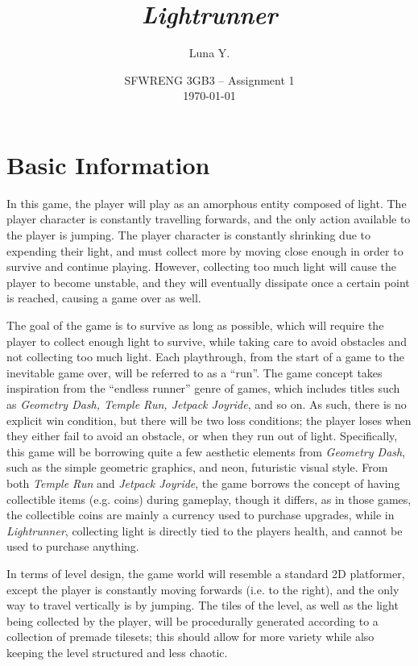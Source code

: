 \documentclass[10pt]{article}
\begin{document}
\title{\textit{Lightrunner}}
\author{Luna Y.}
\date{
    SFWRENG 3GB3 -- Assignment 1\\[0.25cm]
    \today
}
\maketitle

\tableofcontents

\section{Basic Information}

In this game, the player will play as an amorphous entity composed of light. The player character is constantly travelling forwards,
and the only action available to the player is jumping. The player character is constantly shrinking due to expending their light,
and must collect more by moving close enough in order to survive and continue playing. However, collecting too much light will
cause the player to become unstable, and they will eventually dissipate once a certain point is reached, causing a game over as well.

The goal of the game is to survive as long as possible, which will require the player to collect enough light to survive,
while taking care to avoid obstacles and not collecting too much light. Each playthrough, from the start of a game to the inevitable game over,
will be referred to as a ``run''. The game concept takes inspiration from the ``endless runner'' genre of games,
which includes titles such as \textit{Geometry Dash, Temple Run, Jetpack Joyride}, and so on. As such, there is no explicit win condition,
but there will be two loss conditions; the player loses when they either fail to avoid an obstacle, or when they run out of light.
Specifically, this game will be borrowing quite a few aesthetic elements from \textit{Geometry Dash}, such as the simple geometric graphics,
and neon, futuristic visual style. From both \textit{Temple Run} and \textit{Jetpack Joyride}, the game borrows the concept of having
collectible items (e.g. coins) during gameplay, though it differs, as in those games, the collectible coins are mainly a currency
used to purchase upgrades, while in \textit{Lightrunner}, collecting light is directly tied to the players health, and cannot be used to purchase
anything.

In terms of level design, the game world will resemble a standard 2D platformer, except the player is constantly moving forwards (i.e. to the right),
and the only way to travel vertically is by jumping. The tiles of the level, as well as the light being collected by the player,
will be procedurally generated according to a collection of premade tilesets; this should allow for more variety while also keeping
the level structured and less chaotic.
\end{document}
